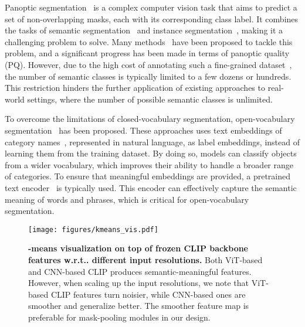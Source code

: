\documentclass{article}
\makeatletter
\DeclareRobustCommand\onedot{\futurelet\@let@token\@onedot}
\def\@onedot{\ifx\@let@token.\else.\null\fi\xspace}
\def\wrt{w.r.t\onedot}
\makeatother
\begin{document}
Panoptic segmentation~\cite{kirillov2018panoptic} is a complex computer vision task that aims to predict a set of non-overlapping masks, each with its corresponding class label.
It combines the tasks of semantic segmentation~\cite{he2004multiscale} and instance segmentation~\cite{hariharan2014simultaneous}, making it a challenging problem to solve.
Many methods~\cite{kirillov2019panoptic,xiong2019upsnet,cheng2019panoptic,wang2021max,li2021panoptic,yu2022cmt,cheng2021masked,yu2022k,liang2023clustseg} have been proposed to tackle this problem, and a significant progress has been made in terms of panoptic quality (PQ).
However, due to the high cost of annotating such a fine-grained dataset~\cite{lin2014microsoft,Cordts2016Cityscapes}, the number of semantic classes is typically limited to a few dozens or hundreds.
This restriction hinders the further application of existing approaches to real-world settings, where the number of possible semantic classes is unlimited.

To overcome the limitations of closed-vocabulary segmentation, open-vocabulary segmentation~\cite{li2022language,xu2021simple,ghiasi2022scaling,ding2022open} has been proposed. These approaches uses text embeddings of category names~\cite{zareian2021open}, represented in natural language, as label embeddings, instead of learning them from the training dataset.
By doing so, models can classify objects from a wider vocabulary, which improves their ability to handle a broader range of categories.
To ensure that meaningful embeddings are provided, a pretrained text encoder~\cite{devlin2019bert,raffel2020exploring,liu2019roberta,radford2021learning} is typically used. This encoder can effectively capture the semantic meaning of words and phrases, which is critical for open-vocabulary segmentation.

\begin{figure}[!t]
    \centering
    \vspace{-15ex}
    \texttt{[image: figures/kmeans\_vis.pdf]}
    \vspace{-15ex}
    \caption{\textbf{-means visualization on top of frozen CLIP backbone features \wrt different input resolutions.} Both ViT-based and CNN-based CLIP produces semantic-meaningful features. However, when scaling up the input resolutions, we note that ViT-based CLIP features turn noisier, while CNN-based ones are smoother and generalize better. The smoother feature map is preferable for mask-pooling modules in our design.
    }
    \label{fig:kmeans_vis}
\end{figure}
\end{document}
